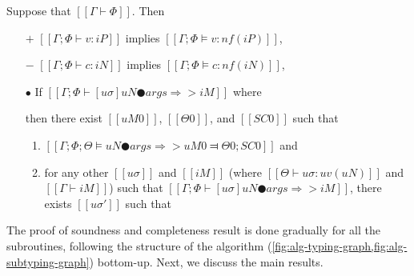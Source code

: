 \begin{theorem*}
    \label{thm:completeness-typing}
    Suppose that $[[Γ ⊢ Φ]]$. Then\footnotemark[1]
    \begin{itemize}
        \item [$+$] $[[Γ; Φ ⊢ v : iP]]$ implies $[[Γ; Φ ⊨ v : nf(iP)]]$,
        \item [$-$] $[[Γ; Φ ⊢ c : iN]]$ implies $[[Γ; Φ ⊨ c : nf(iN)]]$,
        \item [$\bullet$] If $[[Γ; Φ ⊢ [uσ]uN ● args ⇒> iM]]$
            where 
            then there exist $[[uM0]]$, $[[Θ0]]$, and $[[SC0]]$ such that
            \begin{enumerate}
                \item $[[ Γ; Φ; Θ ⊨ uN ● args ⇒> uM0 ⫤ Θ0; SC0 ]]$ and
                \item \label{point:mostGeneral} for any other $[[uσ]]$ and $[[iM]]$ 
                (where $[[Θ ⊢ uσ : uv(uN)]]$ and $[[Γ ⊢ iM]]$)
                    such that $[[Γ; Φ ⊢ [uσ]uN ● args ⇒> iM]]$, 
                    there exists $[[uσ']]$ such that 
            \end{enumerate}
    \end{itemize}
\end{theorem*}



The proof of soundness and completeness result is done gradually
for all the subroutines,
following the structure of the algorithm 
(\cref{fig:alg-typing-graph,fig:alg-subtyping-graph})
bottom-up. Next, we discuss the main results. 

